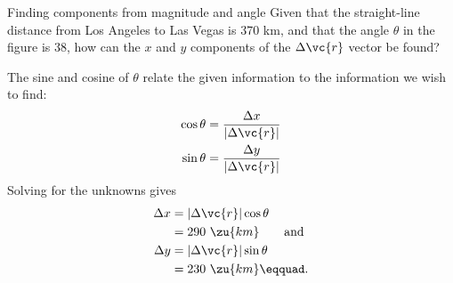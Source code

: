 \begin{eg}{Finding components from magnitude and angle}\label{eg:la-vegas-components}
\egquestion Given that the straight-line distance from Los
Angeles to Las Vegas is 370 km, and that the angle $\theta $
in the figure is 38\degunit, how can the $x$ and $y$ components of
the $\Delta \vc{r}$ vector be found?

\eganswer The sine and cosine of $\theta $ relate the given
information to the information we wish to find:
\begin{align*}
        \cos  \theta      &=  \frac{\Delta x}{|\Delta\vc{r}|}  \\
        \sin  \theta      &=  \frac{\Delta y}{|\Delta\vc{r}|}  
\end{align*}
Solving for the unknowns gives
\begin{align*}
        \Delta x     &= |\Delta\vc{r}|\cos\theta   \\
             &=  290\ \zu{km}  \qquad \text{and}\\
        \Delta y     &= |\Delta\vc{r}|\sin\theta   \\
             &=  230\ \zu{km}\eqquad.
\end{align*}
\end{eg}

